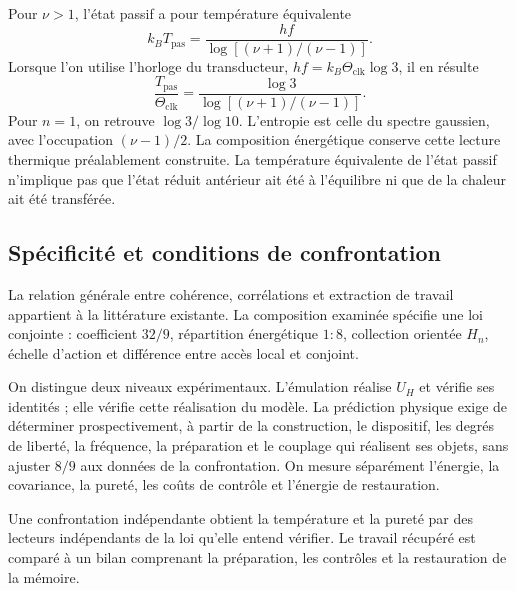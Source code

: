 Pour $\nu>1$, l’état passif a pour température équivalente
\begin{equation}
 k_BT_{\mathrm{pas}}
 =\frac{hf}{\log[(\nu+1)/(\nu-1)]}.
 \label{md:aux:temperatura-pasiva}
\end{equation}
Lorsque l’on utilise l’horloge du transducteur,
$hf=k_B\Theta_{\mathrm{clk}}\log3$, il en résulte
\begin{equation}
 \frac{T_{\mathrm{pas}}}{\Theta_{\mathrm{clk}}}
 =\frac{\log3}{\log[(\nu+1)/(\nu-1)]}.
 \label{md:aux:razon-temperaturas}
\end{equation}
Pour $n=1$, on retrouve $\log3/\log10$. L’entropie est
celle du spectre gaussien, avec l’occupation $(\nu-1)/2$.
La composition énergétique conserve cette lecture thermique
préalablement construite. La température équivalente de
l’état passif n’implique pas que l’état réduit antérieur
ait été à l’équilibre ni que de la chaleur ait été transférée.

\subsection{Spécificité et conditions de confrontation}
\label{md:aux:contraste-trabajo}

La relation générale entre cohérence, corrélations et
extraction de travail appartient à la littérature existante.
La composition examinée spécifie une loi conjointe :
coefficient $32/9$, répartition énergétique $1:8$, collection
orientée $H_n$, échelle d’action et différence entre
accès local et conjoint.

On distingue deux niveaux expérimentaux. L’émulation
réalise $U_H$ et vérifie ses identités ; elle vérifie cette
réalisation du modèle. La prédiction physique exige de
déterminer prospectivement, à partir de la construction, le
dispositif, les degrés de liberté, la fréquence, la
préparation et le couplage qui réalisent ses objets,
sans ajuster $8/9$ aux données de la confrontation. On mesure
séparément l’énergie, la covariance, la pureté, les coûts de
contrôle et l’énergie de restauration.

Une confrontation indépendante obtient la température et la pureté
par des lecteurs indépendants de la loi qu’elle entend
vérifier. Le travail récupéré est comparé à un
bilan comprenant la préparation, les contrôles et la restauration
de la mémoire.

